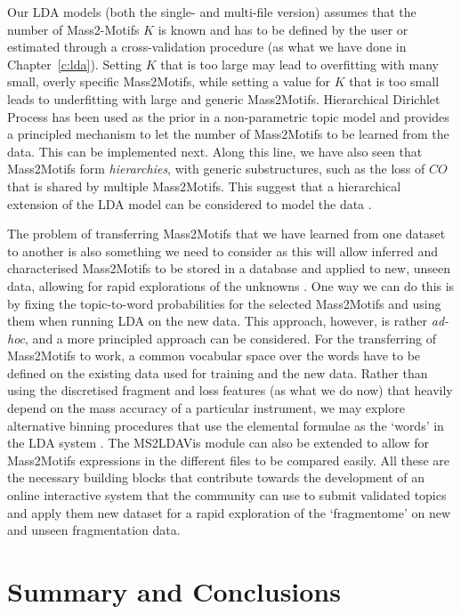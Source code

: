 Our LDA models (both the single- and multi-file version) assumes that the number of Mass2-Motifs $K$ is known and has to be defined by the user or estimated through a cross-validation procedure (as what we have done in Chapter~\ref{c:lda}). Setting $K$ that is too large may lead to overfitting with many small, overly specific Mass2Motifs, while setting a value for $K$ that is too small leads to underfitting with large and generic Mass2Motifs. Hierarchical Dirichlet Process has been used as the prior in a non-parametric topic model \cite{teh2012hierarchical} and provides a principled mechanism to let the number of Mass2Motifs to be learned from the data. This can be implemented next. Along this line, we have also seen that Mass2Motifs form \emph{hierarchies}, with generic substructures, such as the loss of $CO$ that is shared by multiple Mass2Motifs. This suggest that a hierarchical extension of the LDA model can be considered to model the data \cite{griffiths2004hierarchical}. 

The problem of transferring Mass2Motifs that we have learned from one dataset to another is also something we need to consider as this will allow inferred and characterised Mass2Motifs to be stored in a database and applied to new, unseen data, allowing for rapid explorations of the unknowns . One way we can do this is by fixing the topic-to-word probabilities for the selected Mass2Motifs and using them when running LDA on the new data. This approach, however, is rather \textit{ad-hoc}, and a more principled approach can be considered. For the transferring of Mass2Motifs to work, a common vocabular space over the words have to be defined on the existing data used for training and the new data. Rather than using the discretised fragment and loss features (as what we do now) that heavily depend on the mass accuracy of a particular instrument, we may explore alternative binning procedures that use the elemental formulae as the `words' in the LDA system . The MS2LDAVis module can also be extended to allow for Mass2Motifs expressions in the different files to be compared easily. All these are the necessary building blocks that contribute towards the development of an online interactive system that the community can use to submit validated topics and apply them new dataset for a rapid exploration of the `fragmentome' on new and unseen fragmentation data.

\section{Summary and Conclusions}

